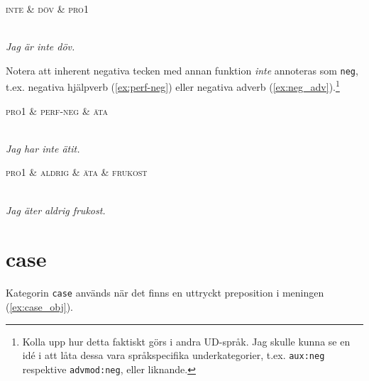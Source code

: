 \documentclass[11pt,a4paper]{article}
\begin{document}
\begin{example}
\label{ex:neg_noun}
\begin{dependency}[theme = simple]
   \begin{deptext}[column sep=1em]
      \textsc{inte} \& \textsc{döv} \& \textsc{pro1} \\
   \end{deptext}
\end{dependency}
\\
\textit{Jag är inte döv.}
\end{example}

\noindent Notera att inherent negativa tecken med annan funktion \textit{inte} annoteras som \texttt{neg}, t.ex. negativa hjälpverb (\ref{ex:perf-neg}) eller negativa adverb (\ref{ex:neg_adv}).\footnote{Kolla upp hur detta faktiskt görs i andra UD-språk. Jag skulle kunna se en idé i att låta dessa vara språkspecifika underkategorier, t.ex. \texttt{aux:neg} respektive \texttt{advmod:neg}, eller liknande.}

\begin{example}
\label{ex:perf-neg}
\begin{dependency}[theme = simple]
   \begin{deptext}[column sep=1em]
      \textsc{pro1} \& \textsc{perf-neg} \& \textsc{äta} \\
   \end{deptext}
\end{dependency}
\\
\textit{Jag har inte ätit.}
\end{example}

\begin{example}
\label{ex:neg_adv}
\begin{dependency}[theme = simple]
   \begin{deptext}[column sep=1em]
      \textsc{pro1} \& \textsc{aldrig} \& \textsc{äta} \& \textsc{frukost} \\
   \end{deptext}
\end{dependency}
\\
\textit{Jag äter aldrig frukost.}
\end{example}

\section{case}
Kategorin \texttt{case} används när det finns en uttryckt preposition i meningen (\ref{ex:case_obj}).
\end{document}
